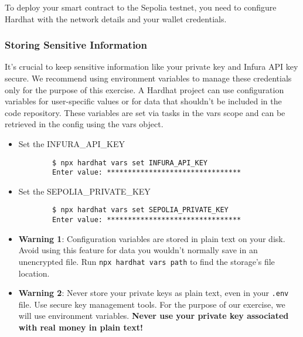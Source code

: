 \documentclass[12pt]{article}
\begin{document}
To deploy your smart contract to the Sepolia testnet, you need to configure Hardhat with the network details and your wallet credentials.

\subsubsection{Storing Sensitive Information}

It's crucial to keep sensitive information like your private key and Infura API key secure. We recommend using environment variables to manage these credentials only for the purpose of this exercise. A Hardhat project can use configuration variables for user-specific values or for data that shouldn't be included in the code repository. These variables are set via tasks in the vars scope and can be retrieved in the config using the vars object. 

\begin{itemize}
    \item Set the INFURA\_API\_KEY
    
    \begin{verbatim}
        $ npx hardhat vars set INFURA_API_KEY
        Enter value: ********************************
    \end{verbatim}

    \item Set the SEPOLIA\_PRIVATE\_KEY

    \begin{verbatim}
        $ npx hardhat vars set SEPOLIA_PRIVATE_KEY
        Enter value: ********************************
    \end{verbatim}
\end{itemize}

\begin{itemize}
    \item \textbf{Warning 1}: Configuration variables are stored in plain text on your disk. Avoid using this feature for data you wouldn’t normally save in an unencrypted file. Run \texttt{npx hardhat vars path} to find the storage's file location.

    \item \textbf{Warning 2}: Never store your private keys as plain text, even in your \texttt{.env} file. Use secure key management tools. For the purpose of our exercise, we will use environment variables. \textbf{Never use your private key associated with real money in plain text!}
\end{itemize}
\end{document}
